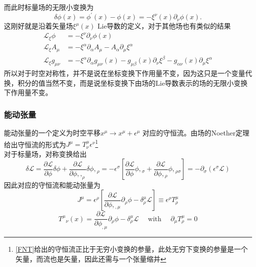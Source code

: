 \documentclass[10pt,openany]{book}
\theoremstyle{thmstyle} %
\theoremstyle{defstyle} %
\theoremstyle{prostyle} %
\begin{document}
而此时标量场的无限小变换为
\begin{equation}
  \delta \phi(x)=\phi^{\prime}(x)-\phi(x)=-\xi^\nu(x) \partial_\nu \phi(x) .
\end{equation}
这刚好就是沿着矢量场$ \xi^\mu(x) $ Lie导数的定义，对于其他场也有类似的结果
\begin{equation}
  \begin{aligned}
    \mathcal{L}_{\xi} \phi & =-\xi^\nu \partial_\nu \phi(x) \\
    \mathcal{L}_{\xi} A_\mu & =-\xi^\alpha \partial_\alpha A_\mu-A_\alpha \partial_\mu \xi^\alpha \\
    \mathcal{L}_{\xi} g_{\mu \nu} & =-\xi^\alpha \partial_\alpha g_{\mu \nu}(x)-g_{\mu \beta}(x) \partial_\nu \xi^\beta-g_{\alpha \nu}(x) \partial_\mu \xi^\alpha
    \end{aligned}
\end{equation}
所以对于时空对称性，并不是说在坐标变换下作用量不变，因为这只是一个变量代换，积分的值当然不变，而是说坐标变换下由场的Lie导数表示的场的无限小变换下作用量不变。
\subsubsection{能动张量}
能动张量的一个定义为时空平移$ x^\mu \rightarrow x^\mu+\epsilon^\mu $ 对应的守恒流。由场的Noether定理给出守恒流的形式为$ J^\mu=T_\nu^\mu \epsilon^\nu $\footnote{\eqref{FNT}给出的守恒流正比于无穷小变换的参量，此处无穷下变换的参量是一个矢量，而流也是矢量，因此还需与一个张量缩并}\\
对于标量场，对称变换给出
\begin{equation}
  \delta \mathcal{L}=\frac{\partial \mathcal{L}}{\partial \phi} \delta \phi+\frac{\partial \mathcal{L}}{\partial \phi,,_\rho} \delta \phi,{ }_\rho=-\epsilon^\sigma\left[\frac{\partial \mathcal{L}}{\partial \phi} \phi,{ }_\sigma+\frac{\partial \mathcal{L}}{\partial \phi,{ }_\rho} \phi,{ }_{\rho \sigma}\right]=-\partial_\sigma\left(\epsilon^\sigma \mathcal{L}\right)
\end{equation}
因此对应的守恒流和能动张量为
\begin{equation}
  J^\mu=\epsilon^\rho\left[\frac{\partial \mathcal{L}}{\partial \phi,{ }_{, \mu}} \partial_\rho \phi-\delta_\rho^\mu \mathcal{L}\right] \equiv \epsilon^\rho T_\rho^\mu
\end{equation}
\begin{equation}
  T^\mu{ }_\nu(x)=\frac{\partial \mathcal{L}}{\partial \phi_{, \mu}} \partial_\rho \phi-\delta_\rho^\mu \mathcal{L} \quad \text { with } \quad \partial_\mu T_\rho^\mu=0
\end{equation}
\end{document}
